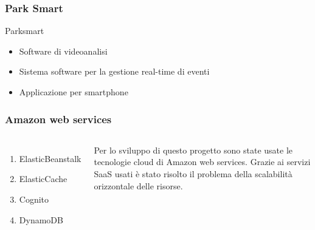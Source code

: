 \documentclass{beamer}
\begin{document}
\begin{frame}
\frametitle{Park Smart}
Parksmart 
\begin{itemize}
\item Software di videoanalisi
\item Sistema software per la gestione real-time di eventi
\item Applicazione per smartphone
\end{itemize}
\end{frame}


\begin{frame}
\frametitle{Amazon web services}
\begin{columns}[c] 


\begin{enumerate}
\item ElasticBeanstalk
\item ElasticCache
\item Cognito
\item DynamoDB
\end{enumerate}

Per lo sviluppo di questo progetto sono state usate le tecnologie cloud di Amazon web services. Grazie ai servizi SaaS usati \`e stato risolto il problema della scalabilit\`a orizzontale delle risorse.

\end{columns}
\end{frame}
\end{document}
